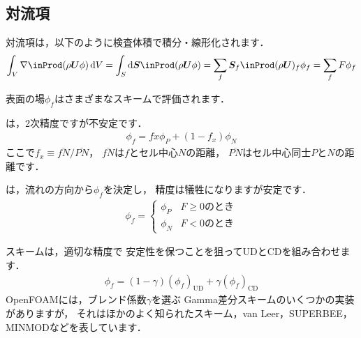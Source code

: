 \subsection{対流項}
\label{ssec:2.4.2}
%
対流項は，以下のように検査体積で積分・線形化されます．
\begin{align}
 \label{eq:2.16}
 \int_{V}\nabla \inProd (\rho\bm{U}\phi)\,\mathrm{d}V
 = \int_{S}\mathrm{d}\bm{S} \inProd (\rho\bm{U}\phi)
 = \sum_{f}\bm{S}_{f} \inProd (\rho\bm{U})_{f}\phi_{f}
 = \sum_{f}F\phi_{f}
\end{align}

表面の場$\phi_{f}$はさまざまなスキームで評価されます．
\begin{description}
%
%
 \item[中心差分 (CD)] は，2次精度ですが不安定です．
            \begin{align}
             \label{eq:2.17}
             \phi_{f} = f{x}\phi_{P} + (1 - f_{x})\phi_{N}
            \end{align}
            ここで$f_{x} \equiv \overline{fN}/\overline{PN}$，
            $\overline{fN}$は$f$とセル中心$N$の距離，
            $\overline{PN}$はセル中心同士$P$と$N$の距離です．
%
%
 \item[風上差分 (UD)] は，流れの方向から$\phi_{f}$を決定し，
            精度は犠牲になりますが安定です．
            \begin{align}
             \label{eq:2.18}
             \phi_{f} =
             \begin{cases}
              \phi_{P} & F \ge 0 \text{のとき} \\
              \phi_{N} & F < 0 \text{のとき}
             \end{cases}
            \end{align}
%
%
 \item[ブレンド差分 (BD)] スキームは，適切な精度で
            安定性を保つことを狙ってUDとCDを組み合わせます．
            \begin{align}
             \phi_{f} = (1 - \gamma)(\phi_{f})_{\mathrm{UD}} + \gamma(\phi_{f})_{\mathrm{CD}}
            \end{align}
            OpenFOAMには，ブレンド係数$\gamma$を選ぶ
%  
%  
Gamma差分スキームのいくつかの実装がありますが，
%  
%  
%  
%  
%  
            それはほかのよく知られたスキーム，van Leer，SUPERBEE，MINMODなどを表しています．
\end{description}


